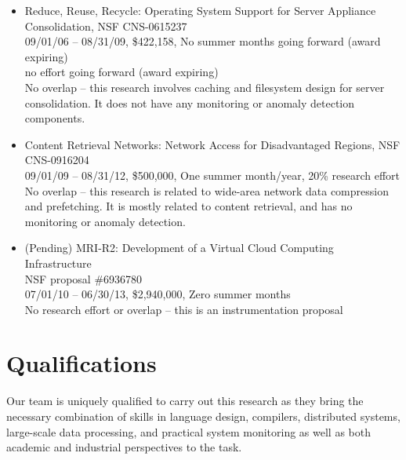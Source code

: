 \documentclass[12pt]{article}
\begin{document}
\begin{itemize}


\item Reduce, Reuse, Recycle:  Operating System Support for Server Appliance Consolidation, 
NSF CNS-0615237\\
09/01/06 -- 08/31/09, \$422,158, No summer months going forward (award expiring) \\
no effort going forward (award expiring) \\
No overlap -- this research involves caching and filesystem design for server
consolidation. It does not have any monitoring or anomaly detection components.

\item Content Retrieval Networks:  Network Access for Disadvantaged Regions, 
NSF CNS-0916204\\
09/01/09 -- 08/31/12, \$500,000, One summer month/year,
20\% research effort \\
No overlap -- this research is related to wide-area network data compression and prefetching. It is mostly related to content retrieval, and has no
monitoring or anomaly detection.

\item (Pending) MRI-R2: Development of a Virtual Cloud Computing Infrastructure \\
NSF proposal \#6936780\\
07/01/10 -- 06/30/13, \$2,940,000, Zero summer months \\
No research effort or overlap -- this is an instrumentation proposal


\end{itemize}





\section{Qualifications}

Our team is uniquely qualified to carry out this research as they
bring the necessary combination of skills in language design,
compilers, distributed systems, large-scale data processing, and
practical system monitoring as well as both academic and industrial
perspectives to the task.  
\end{document}
